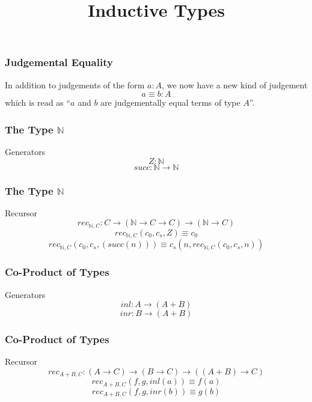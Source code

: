 \documentclass[14pt,compress]{beamer}
\title{Inductive Types}
\date{}
\newcommand{\N}{\mathbb{N}}
\begin{document}
\begin{frame}\label{frame : titlepage}
\titlepage
\end{frame}

\begin{frame}\label{frame : judgemental equality}
\frametitle{Judgemental Equality}

In addition to judgements of the form $a : A$, we now have a new kind of judgement
\textcolor{beamer@mathtext}{
\[ a \equiv b : A \]}
\noindent which is read as
\textcolor{beamer@mathtext}{``$a$ and $b$ are judgementally equal terms of type $A$''}.

\end{frame}

\begin{frame}\label{frame : gen of Nat}
\frametitle{The Type $\mathbb{N}$}

\begin{block}{Generators}
\[ Z : \N \]
\[ succ : \N \to \N \]
\end{block}
\end{frame}

\begin{frame}\label{frame : rec of Nat}
\frametitle{The Type $\mathbb{N}$}

\begin{block}{Recursor}
\[ rec_{\N,C} : C \to (\N \to C \to C) \to (\N \to C) \]
\[ rec_{\N,C}(c_0,c_s,Z) \equiv c_0 \]
\[ rec_{\N,C}(c_0,c_s,(succ(n))) \equiv c_s(n, rec_{\N,C}(c_0,c_s,n)) \]
\end{block}
\end{frame}

\begin{frame}\label{frame : gen of co-product}
\frametitle{Co-Product of Types}

\begin{block}{Generators}
\[ inl : A \to (A + B) \]
\[ inr : B \to (A + B) \]
\end{block}
\end{frame}

\begin{frame}\label{frame : rec of co-product}
\frametitle{Co-Product of Types}

\begin{block}{Recursor}
\[ rec_{A+B,C} : (A \to C) \to (B \to C) \to ((A + B) \to C) \]
\[ rec_{A+B,C}(f,g,inl(a)) \equiv f(a) \]
\[ rec_{A+B,C}(f,g,inr(b)) \equiv g(b) \]
\end{block}
\end{frame}

\end{document}
